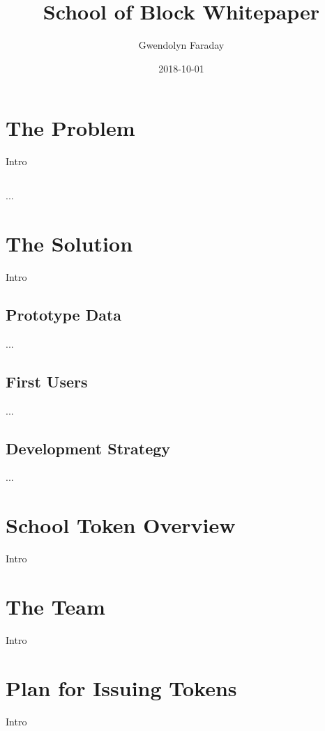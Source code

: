 \documentclass{article}
\title{School of Block Whitepaper}
\date{2018-10-01}
\author{Gwendolyn Faraday}
\begin{document}
  \maketitle
  \newpage

  \section{The Problem}

  Intro

  \subsection{}

  ...

  \section{The Solution}

  Intro

  \subsection{Prototype Data}

  ...

  \subsection{First Users}

  ...

  \subsection{Development Strategy}

  ...

  \section{School Token Overview}

  Intro

  \section{The Team}

  Intro

  \section{Plan for Issuing Tokens}

  Intro
\end{document}
